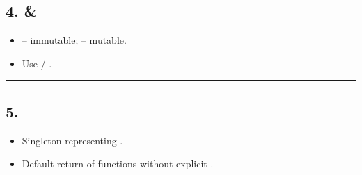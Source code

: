\documentclass[a4paper,11pt,english]{sphinxmanual}
\begin{document}
\subsection{4.  \& }
\label{\detokenize{core_language/syntax_basic_types:bytes-bytearray}}
\begin{sphinxVerbatim}[commandchars=\\\{\}]
  
  
\PYG{p}{[}\PYG{p}{]}  
\end{sphinxVerbatim}
\begin{itemize}
\item {} 
\sphinxAtStartPar
{} – immutable;  – mutable.

\item {} 
\sphinxAtStartPar
Use  / .

\end{itemize}


\bigskip\hrule\bigskip



\subsection{5. }
\label{\detokenize{core_language/syntax_basic_types:none}}\begin{itemize}
\item {} 
\sphinxAtStartPar
Singleton representing .

\item {} 
\sphinxAtStartPar
Default return of functions without explicit .

\end{itemize}

\begin{sphinxVerbatim}[commandchars=\\\{\}]
 
  
\end{sphinxVerbatim}
\end{document}
